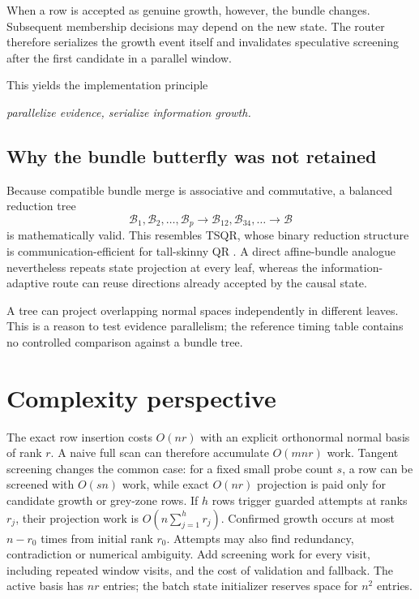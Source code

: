 \documentclass[11pt]{article}
\theoremstyle{definition}
\newcommand{\Bun}{\mathcal{B}}
\begin{document}
When a row is accepted as genuine growth, however, the bundle changes. Subsequent membership decisions may depend on the new state. The router therefore serializes the growth event itself and invalidates speculative screening after the first candidate in a parallel window.

This yields the implementation principle
\begin{center}
\emph{parallelize evidence, serialize information growth.}
\end{center}

\subsection{Why the bundle butterfly was not retained}
Because compatible bundle merge is associative and commutative, a balanced reduction tree
\[
\Bun_1,\Bun_2,\ldots,\Bun_p
\longrightarrow
\Bun_{12},\Bun_{34},\ldots
\longrightarrow
\Bun
\]
is mathematically valid. This resembles TSQR, whose binary reduction structure is communication-efficient for tall-skinny QR \citep{DemmelEtAl2008}. A direct affine-bundle analogue nevertheless repeats state projection at every leaf, whereas the information-adaptive route can reuse directions already accepted by the causal state.

A tree can project overlapping normal spaces independently in different leaves. This is a reason to test evidence parallelism; the reference timing table contains no controlled comparison against a bundle tree.

\section{Complexity perspective}
The exact row insertion costs \(O(nr)\) with an explicit orthonormal normal basis of rank \(r\). A naive full scan can therefore accumulate \(O(mnr)\) work. Tangent screening changes the common case: for a fixed small probe count \(s\), a row can be screened with \(O(sn)\) work, while exact \(O(nr)\) projection is paid only for candidate growth or grey-zone rows. If $h$ rows trigger guarded attempts at ranks $r_j$, their projection work is $O(n\sum_{j=1}^h r_j)$. Confirmed growth occurs at most $n-r_0$ times from initial rank $r_0$. Attempts may also find redundancy, contradiction or numerical ambiguity. Add screening work for every visit, including repeated window visits, and the cost of validation and fallback. The active basis has $nr$ entries; the batch state initializer reserves space for $n^2$ entries.
\end{document}
